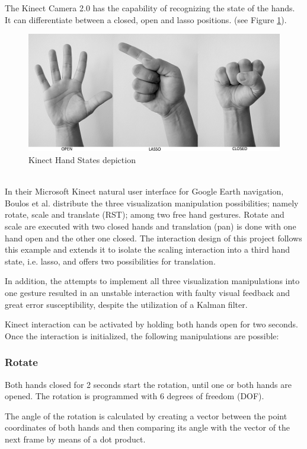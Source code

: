 \documentclass[12pt]{extarticle}
\begin{document}
\begin{appendices}
The Kinect Camera 2.0 has the capability of recognizing the state of the hands. It can differentiate between a closed, open and lasso positions. (see Figure \ref{fig: OCL}).
\begin{figure}[ht!]
\includegraphics[scale=1.5]{Images/KinectHandStates.png}
\caption{Kinect Hand States depiction}
\label{fig: OCL}
\end{figure}\\
In their Microsoft Kinect natural user interface for Google Earth navigation, Boulos et al. \cite{Kinoogle} distribute the three visualization manipulation possibilities; namely rotate, scale and translate (RST); among two free hand gestures. Rotate and scale are executed with two closed hands and translation (pan) is done with one hand open and the other one closed. The interaction design of this project follows this example and extends it to isolate the scaling interaction into a third hand state, i.e. lasso, and offers two possibilities for translation.

In addition, the attempts to implement all three visualization manipulations into one gesture resulted in an unstable interaction with faulty visual feedback and great error susceptibility, despite the utilization of a Kalman filter.

Kinect interaction can be activated by holding both hands open for two seconds. Once the interaction is initialized, the following manipulations are possible:

\subsubsection {Rotate}\label{subsubsec Rot}
Both hands closed for 2 seconds start the rotation, until one or both hands are opened. The rotation is programmed with 6 degrees of freedom (DOF).

The angle of the rotation is calculated by creating a vector between the point coordinates of both hands and then comparing its angle with the vector of the next frame by means of a dot product.


\end{appendices}
\end{document}

